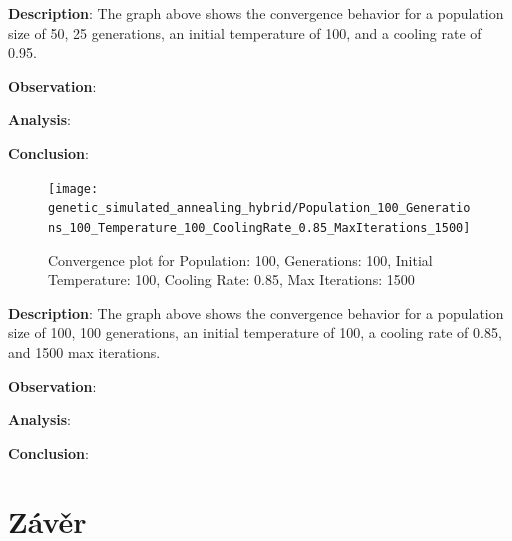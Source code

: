 \documentclass[
]{article}
\begin{document}
\textbf{Description}: The graph above shows the convergence behavior for a population size of 50, 25 generations, an initial temperature of 100, and a cooling rate of 0.95.

\textbf{Observation}:

\textbf{Analysis}:

\textbf{Conclusion}:

\begin{figure}[H]
    \centering
    \texttt{[image: genetic\_simulated\_annealing\_hybrid/Population\_100\_Generations\_100\_Temperature\_100\_CoolingRate\_0.85\_MaxIterations\_1500]}
    \caption{Convergence plot for Population: 100, Generations: 100, Initial Temperature: 100, Cooling Rate: 0.85, Max Iterations: 1500}
    \label{fig:ga_sa_100_100_100_085_1500}
\end{figure}

\textbf{Description}: The graph above shows the convergence behavior for a population size of 100, 100 generations, an initial temperature of 100, a cooling rate of 0.85, and 1500 max iterations.

\textbf{Observation}:

\textbf{Analysis}:

\textbf{Conclusion}:




%




    \newpage
    \hypertarget{zuxe1vux11br}{%


        \section{Závěr}\label{zuxe1vux11br}}
\end{document}

